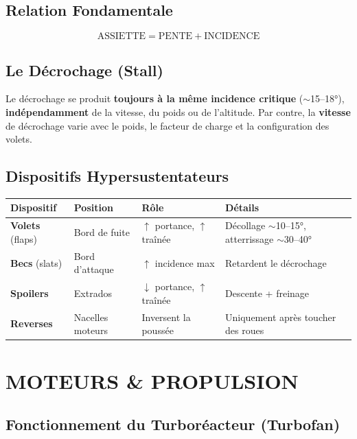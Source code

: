 \documentclass[11pt,a4paper]{article}
\begin{document}
\subsection{Relation Fondamentale}
$$\boxed{\text{ASSIETTE} = \text{PENTE} + \text{INCIDENCE}}$$

\subsection{Le Décrochage (Stall)}

\begin{warnbox}
Le décrochage se produit \textbf{toujours à la même incidence critique} ($\sim$15--18°), \textbf{indépendamment} de la vitesse, du poids ou de l'altitude. Par contre, la \textbf{vitesse} de décrochage varie avec le poids, le facteur de charge et la configuration des volets.
\end{warnbox}

\subsection{Dispositifs Hypersustentateurs}

\begin{tabular}{p{3cm}p{2.5cm}p{3cm}p{5.5cm}}
\toprule
\textbf{Dispositif} & \textbf{Position} & \textbf{Rôle} & \textbf{Détails} \\
\midrule
\textbf{Volets} (flaps) & Bord de fuite & $\uparrow$ portance, $\uparrow$ traînée & Décollage $\sim$10--15°, atterrissage $\sim$30--40° \\
\textbf{Becs} (slats) & Bord d'attaque & $\uparrow$ incidence max & Retardent le décrochage \\
\textbf{Spoilers} & Extrados & $\downarrow$ portance, $\uparrow$ traînée & Descente + freinage \\
\textbf{Reverses} & Nacelles moteurs & Inversent la poussée & Uniquement après toucher des roues \\
\bottomrule
\end{tabular}

\section{MOTEURS \& PROPULSION}

\subsection{Fonctionnement du Turboréacteur (Turbofan)}
\end{document}
